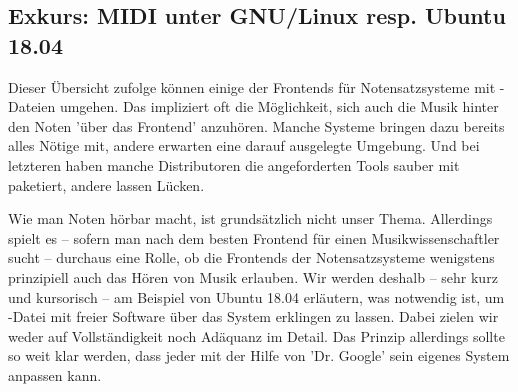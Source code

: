 %
%
%




\subsection{Exkurs: MIDI unter GNU/Linux resp. Ubuntu 18.04}

Dieser Übersicht zufolge können einige der Frontends für Notensatzsysteme mit
-Dateien umgehen. Das impliziert oft die Möglichkeit, sich auch die
Musik hinter den Noten 'über das Frontend' anzuhören. Manche Systeme bringen dazu
bereits alles Nötige mit, andere erwarten eine darauf ausgelegte Umgebung. Und
bei letzteren haben manche Distributoren die angeforderten Tools sauber mit
paketiert, andere lassen Lücken.

Wie man Noten hörbar macht, ist grundsätzlich nicht unser Thema. Allerdings
spielt es -- sofern man nach dem besten Frontend für einen Musikwissenschaftler
sucht -- durchaus eine Rolle, ob die Frontends der Notensatzsysteme wenigstens
prinzipiell auch das Hören von Musik erlauben. Wir werden deshalb -- sehr kurz
und kursorisch -- am Beispiel von Ubuntu 18.04 erläutern, was notwendig ist, um
-Datei mit freier Software über das System erklingen zu lassen. Dabei
zielen wir weder auf Vollständigkeit noch Adäquanz im Detail. Das Prinzip
allerdings sollte so weit klar werden, dass jeder mit der Hilfe von 'Dr. Google'
sein eigenes System anpassen kann.

